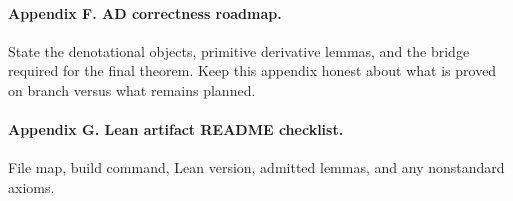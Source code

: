 \paragraph{Appendix F. AD correctness roadmap.}
State the denotational objects, primitive derivative lemmas, and the bridge required for the final theorem. Keep this appendix honest about what is proved on branch versus what remains planned.

\paragraph{Appendix G. Lean artifact README checklist.}
File map, build command, Lean version, admitted lemmas, and any nonstandard axioms.
